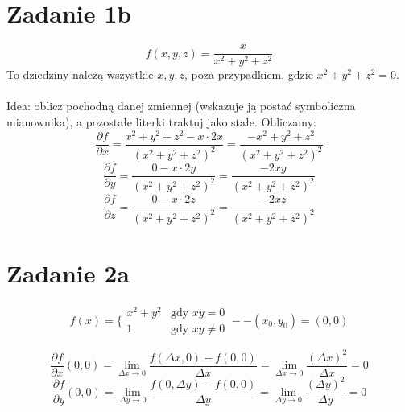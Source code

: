 \documentclass{article}
\begin{document}


\section*{Zadanie 1b}

$$f(x,y,z) = \frac{x}{x^2 + y^2 + z^2}$$
To dziedziny należą wszystkie $x,y,z$, poza przypadkiem, gdzie $x^2+y^2+z^2=0$. \\ \\
Idea: oblicz pochodną danej zmiennej (wskazuje ją postać symboliczna mianownika), a pozostałe literki traktuj jako stałe. Obliczamy:
$$\frac{\partial f}{\partial x} = \frac{x^2+y^2+z^2 - x \cdot 2x}{(x^2+y^2+z^2)^2} = \frac{-x^2+y^2+z^2}{(x^2+y^2+z^2)^2}$$
$$\frac{\partial f}{\partial y} = \frac{0 - x \cdot 2y}{(x^2+y^2+z^2)^2} = \frac{-2xy}{(x^2+y^2+z^2)^2}$$
$$\frac{\partial f}{\partial z} = \frac{0 - x \cdot 2z}{(x^2+y^2+z^2)^2} = \frac{-2xz}{(x^2+y^2+z^2)^2}$$

\section*{Zadanie 2a}
$$f(x)=\bigg\{ \begin{array}{rl}
x^2 + y^2 & \textrm{gdy $xy = 0$} \\ 1 & \textrm{gdy $xy \neq 0$} \end{array} -- (x_0,y_0) = (0,0)$$
 
$$\frac{\partial f}{\partial x} (0,0) = \lim_{\Delta x \to 0} \frac{f(\Delta x,0) - f(0,0)}{\Delta x} = \lim_{\Delta x \to 0} \frac{(\Delta x)^2}{\Delta x} = 0$$
$$\frac{\partial f}{\partial y} (0,0) = \lim_{\Delta y \to 0} \frac{f(0,\Delta y) - f(0,0)}{\Delta y} = \lim_{\Delta y \to 0} \frac{(\Delta y)^2}{\Delta y} = 0$$
\end{document}
